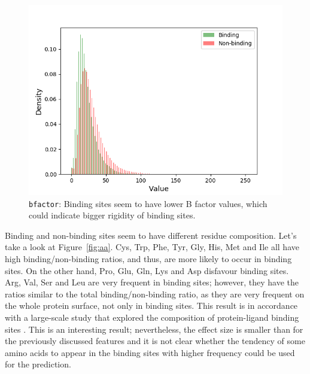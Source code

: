 \begin{figure}[!htbp]
\centering
\includegraphics[width=0.7\linewidth]{../img/bfactor_hist.png}
\caption{\texttt{bfactor}: Binding sites seem to have lower B factor values, which could indicate bigger rigidity of binding sites.}
\label{fig:bfactor}
\end{figure}

Binding and non-binding sites seem to have different residue composition. Let's take a look at Figure~\ref{fig:aa}. Cys, Trp, Phe, Tyr, Gly, His, Met and Ile all have high binding/non-binding ratios, and thus, are more likely to occur in binding sites. On the other hand, Pro, Glu, Gln, Lys and Asp disfavour binding sites. Arg, Val, Ser and Leu are very frequent in binding sites; however, they have the ratios similar to the total binding/non-binding ratio, as they are very frequent on the whole protein surface, not only in binding sites. This result is in accordance with a large-scale study that explored the composition of protein-ligand binding sites \cite{lbscomposition}. This is an interesting result; nevertheless, the effect size is smaller than for the previously discussed features and it is not clear whether the tendency of some amino acids to appear in the binding sites with higher frequency could be used for the prediction.

